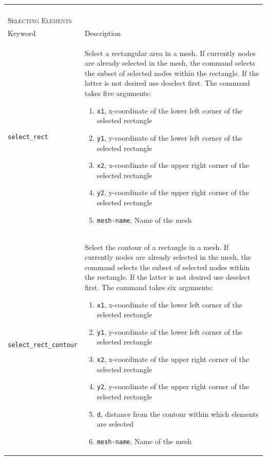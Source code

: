 \documentclass[noshowpacs,preprintnumbers,amsmath,amssymb, letter]{revtex4}
\begin{document}
\begin{longtable}{p{}p{}}
\begin{enumerate}
\end{enumerate}\\
\multicolumn{2}{l}{\textsc{Selecting Elements}} \\*
\hline
Keyword & Description \\
\texttt{select\_rect}	& Select a rectangular area in a mesh. If currently nodes are already selected in the mesh, the command selects the subset of selected nodes within the rectangle. If the latter is not desired use deselect first. The command takes five arguments:
\begin{enumerate}
\item \texttt{x1}, x-coordinate of the lower left corner of the selected rectangle
\item \texttt{y1}, y-coordinate of the lower left corner of the selected rectangle
\item \texttt{x2}, x-coordinate of the upper right corner of the selected rectangle
\item \texttt{y2}, y-coordinate of the upper right corner of the selected rectangle
\item \texttt{mesh-name}, Name of the mesh
\end{enumerate}\\
\texttt{select\_rect\_contour}	& Select the contour of a rectangle in a mesh. If currently nodes are already selected in the mesh, the command selects the subset of selected nodes within the rectangle. If the latter is not desired use deselect first. The command takes six arguments:
\begin{enumerate}
\item \texttt{x1}, x-coordinate of the lower left corner of the selected rectangle
\item \texttt{y1}, y-coordinate of the lower left corner of the selected rectangle
\item \texttt{x2}, x-coordinate of the upper right corner of the selected rectangle
\item \texttt{y2}, y-coordinate of the upper right corner of the selected rectangle
\item \texttt{d}, distance from the contour within which elements are selected
\item \texttt{mesh-name}, Name of the mesh
\end{enumerate}\\

\end{longtable}
\end{document}
